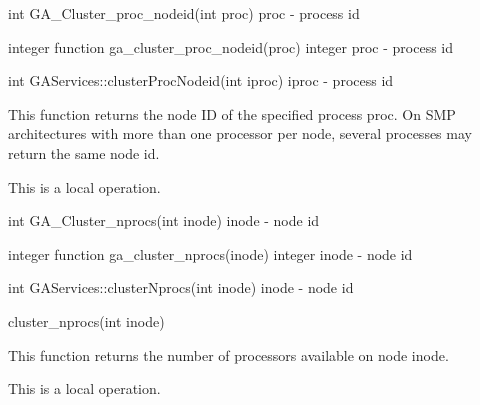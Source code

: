 \documentclass[12pt]{article}
\begin{document}

\begin{capi}
int GA_Cluster_proc_nodeid(int proc)
   proc            - process id                                            \access{[input]}
\end{capi}

\begin{fapi}
integer function ga_cluster_proc_nodeid(proc)
   integer proc    - process id                                            \access{[input]} 
\end{fapi}

\begin{cxxapi}
int GAServices::clusterProcNodeid(int iproc)
   iproc           - process id                                            \access{[input]}
\end{cxxapi}

\begin{desc}

This function returns the node ID of the specified process proc. 
On SMP architectures with more than one processor per node, several 
processes may return the same node id.

This is a  local operation.
\end{desc}


\begin{capi}
int GA_Cluster_nprocs(int inode)
   inode           - node id                                               \access{[input]}
\end{capi}

\begin{fapi}
integer function ga_cluster_nprocs(inode)
   integer inode   - node id                                               \access{[input]} 
\end{fapi}

\begin{cxxapi}
int GAServices::clusterNprocs(int inode)
   inode           - node id                                               \access{[input]}
\end{cxxapi}

\begin{pyapi}
cluster_nprocs(int inode) 
\end{pyapi}

\begin{desc}

This function returns the number of processors available on node inode.

This is a local operation.
\end{desc}
\end{document}
